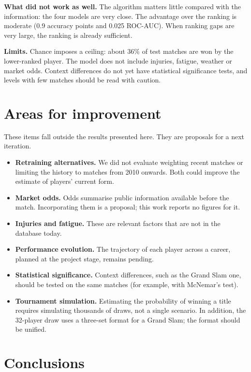 \documentclass[11pt,a4paper]{article}
\begin{document}
\textbf{What did not work as well.} The algorithm matters little compared with the information: the four models are very close. The advantage over the ranking is moderate (0.9 accuracy points and 0.025 ROC-AUC). When ranking gaps are very large, the ranking is already sufficient.

\textbf{Limits.} Chance imposes a ceiling: about 36\% of test matches are won by the lower-ranked player. The model does not include injuries, fatigue, weather or market odds. Context differences do not yet have statistical significance tests, and levels with few matches should be read with caution.

\section{Areas for improvement}

These items fall outside the results presented here. They are proposals for a next iteration.

\begin{itemize}
  \item \textbf{Retraining alternatives.} We did not evaluate weighting recent matches or limiting the history to matches from 2010 onwards. Both could improve the estimate of players' current form.
  \item \textbf{Market odds.} Odds summarise public information available before the match. Incorporating them is a proposal; this work reports no figures for it.
  \item \textbf{Injuries and fatigue.} These are relevant factors that are not in the database today.
  \item \textbf{Performance evolution.} The trajectory of each player across a career, planned at the project stage, remains pending.
  \item \textbf{Statistical significance.} Context differences, such as the Grand Slam one, should be tested on the same matches (for example, with McNemar's test).
  \item \textbf{Tournament simulation.} Estimating the probability of winning a title requires simulating thousands of draws, not a single scenario. In addition, the 32-player draw uses a three-set format for a Grand Slam; the format should be unified.
\end{itemize}

\section{Conclusions}
\end{document}
